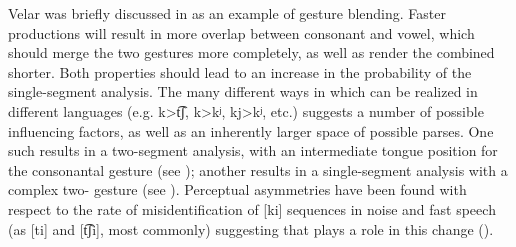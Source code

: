 Velar  was briefly discussed in 
as an example of gesture blending. Faster productions will result
in more overlap between consonant and vowel, which should merge the
two gestures more completely, as well as render the combined 
shorter. Both  properties should lead to an increase in the
probability of the single-segment analysis. The many different ways
in which  can be realized in different languages (e.g.
{k\textgreater t͡ʃ}, {k\textgreater kʲ}, {kj\textgreater kʲ},
etc.) suggests a number of possible influencing factors, as well
as an inherently larger space of possible parses. One such  results
in a two-segment analysis, with an intermediate tongue position for
the consonantal gesture (see ); another
results in a single-segment analysis with a complex two- gesture
(see ). Perceptual asymmetries have
been found with respect to the rate of misidentification of {[}ki{]}
sequences in noise and fast speech (as {[}ti{]} and {[t͡ʃi]},
most commonly) suggesting that   plays a role in this
change (\citealt{Guion1998,Chang2001}).

